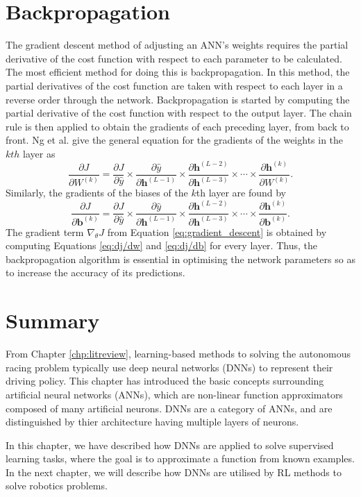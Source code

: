 \section{Backpropagation}
The gradient descent method of adjusting an ANN's weights requires the partial derivative of the cost function with respect to each parameter to be calculated.
The most efficient method for doing this is backpropagation.
In this method, the partial derivatives of the cost function are taken with respect to each layer in a reverse order through the network.
Backpropagation is started by computing the partial derivative of the cost function with respect to the output layer.
The chain rule is then applied to obtain the gradients of each preceding layer, from back to front.
Ng et al. \cite{Ng2019} give the general equation for the gradients of the weights in the $kth$ layer as
\begin{equation}\label{eq:dj/dw}
    \frac{\partial J}{\partial W^{(k)} } =  
    \frac{\partial J}{\partial \hat{y} } \times
    \frac{\partial \hat{y}}{\partial \mathbf{h}^{(L-1)} } \times 
    \frac{\partial \mathbf{h}^{(L-2)}}{\partial \mathbf{h}^{(L-3)} } \times \cdots \times
    \frac{\partial \mathbf{h}^{(k)}}{\partial  W^{(k)}}.
\end{equation}
Similarly, the gradients of the biases of the $k$th layer are found by
\begin{equation}\label{eq:dj/db}
    \frac{\partial J}{\partial \mathbf{b}^{(k)} } =  
    \frac{\partial J}{\partial \hat{y} } \times
    \frac{\partial \hat{y}}{\partial \mathbf{h}^{(L-1)} } \times 
    \frac{\partial \mathbf{h}^{(L-2)}}{\partial \mathbf{h}^{(L-3)} } \times \cdots \times
    \frac{\partial \mathbf{h}^{(k)}}{\partial  \mathbf{b}^{(k)}}.
\end{equation}
The gradient term $\nabla_{\theta}J$ from Equation \ref{eq:gradient_descent} is obtained by computing Equations \ref{eq:dj/dw} and \ref{eq:dj/db} for every layer.
Thus, the backpropagation algorithm is essential in optimising the network parameters so as to increase the accuracy of its predictions.

\section{Summary}

From Chapter \ref{chp:litreview}, learning-based methods to solving the autonomous racing problem typically use deep neural networks (DNNs) to represent their driving policy.
This chapter has introduced the basic concepts surrounding artificial neural networks (ANNs), which are non-linear function approximators composed of many artificial neurons.
DNNs are a category of ANNs, and are distinguished by thier architecture having multiple layers of neurons.

In this chapter, we have described how DNNs are applied to solve supervised learning tasks, where the goal is to approximate a function from known examples.
In the next chapter, we will describe how DNNs are utilised by RL methods to solve robotics problems.

